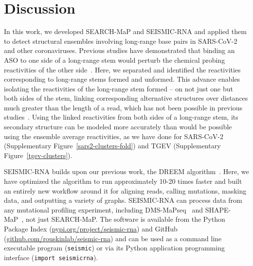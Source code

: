 \documentclass[main.tex]{subfiles}
\begin{document}
\section{Discussion}

In this work, we developed SEARCH-MaP and SEISMIC-RNA and applied them to detect structural ensembles involving long-range base pairs in SARS-CoV-2 and other coronaviruses.
Previous studies have demonstrated that binding an ASO to one side of a long-range stem would perturb the chemical probing reactivities of the other side~\cite{Legiewicz2010,Archer2013,Bai2014}.
Here, we separated and identified the reactivities corresponding to long-range stems formed and unformed.
This advance enables isolating the reactivities of the long-range stem formed -- on not just one but both sides of the stem, linking corresponding alternative structures over distances much greater than the length of a read, which has not been possible in previous studies~\cite{Tomezsko2020,Morandi2021}.
Using the linked reactivities from both sides of a long-range stem, its secondary structure can be modeled more accurately than would be possible using the ensemble average reactivities, as we have done for SARS-CoV-2 (Supplementary Figure~\ref{sars2-clusters-fold}) and TGEV (Supplementary Figure~\ref{tgev-clusters}).

SEISMIC-RNA builds upon our previous work, the DREEM algorithm~\cite{Tomezsko2020}.
Here, we have optimized the algorithm to run approximately 10-20 times faster and built an entirely new workflow around it for aligning reads, calling mutations, masking data, and outputting a variety of graphs.
SEISMIC-RNA can process data from any mutational profiling experiment, including DMS-MaPseq~\cite{Zubradt2016} and SHAPE-MaP~\cite{Siegfried2014}, not just SEARCH-MaP.
The software is available from the Python Package Index (\url{pypi.org/project/seismic-rna}) and GitHub (\url{github.com/rouskinlab/seismic-rna}) and can be used as a command line executable program (\verb|seismic|) or via its Python application programming interface (\verb|import seismicrna|).
\end{document}
